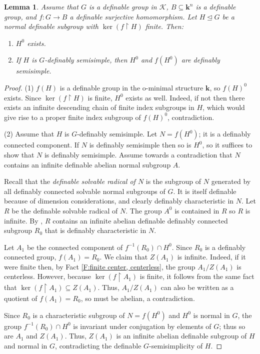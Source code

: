 \documentclass[11pt]{amsart}
\newtheorem{lemma}[theorem]{Lemma}
\theoremstyle{definition}
\newcommand{\bk}{\textbf{k}}
\newcommand{\CK}{{\mathcal K}}
\newcommand{\0}{\emptyset}
\def\sub{\subseteq}
\begin{document}
\begin{lemma}\label{L:connected subgroup of defsemisimple}
  Assume that  $G$ is a definable group in $\CK$,     $B\sub \bk^n$ is a definable group, and   $f:G\to B$ a definable surjective homomorphism.
    Let $H\trianglelefteq G$ be a normal definable subgroup with $\ker(f\restriction H)$ finite.
    Then:
    \begin{enumerate}
        \item $H^0$ exists.
        \item If $H$ is $G$-definably semisimple, then  $H^0$ and $f(H^0)$ are definably semisimple.
    \end{enumerate}
\end{lemma}
\begin{proof}
    
    
    (1) $f(H)$ is a definable group in the o-minimal structure $\bk$, so $f(H)^0$ exists. Since $\ker(f\restriction H)$ is finite, $H^0$ exists as well. Indeed, if not then there exists an infinite descending chain of finite index subgroups in $H$, which would give rise to  a proper finite index subgroup of  $f(H)^0$, contradiction.

    (2) Assume that $H$ is $G$-definably semisimple.  Let $N=f(H^0)$; it is a definably connected component. If $N$ is definably semisimple then so is $H^0$, so it suffices to show that $N$ is definably semisimple. Assume towards a contradiction that $N$ contains an infinite definable abelian normal subgroup $A$. 

    Recall that the {\em definable solvable radical of $N$} is
the subgroup of $N$ generated by all definably connected solvable normal subgroups of $G$. It is itself definable because of dimension considerations, and  clearly definably characteristic in $N$.  Let $R$ be the definable solvable radical of $N$. The group $A^0$ is contained in $R$ so $R$ is infinite. By \cite[Corollary 5.6]{baro-solvconn}, $R$ contains an infinite abelian definable definably connected subgroup $R_0$ that is definably characteristic in $N$.



    Let $A_1$ be the connected component of $f^{-1}(R_0)\cap H^0$. 
    Since $R_0$ is a definably connected group, $f(A_1)=R_0$. We claim that $Z(A_1)$ is infinite. Indeed, if it were finite then, by Fact \ref{F:finite center, centerless}, the group $A_1/Z(A_1)$
   is centerless. However, because  $\ker(f\restriction A_1)$ is finite, it follows from  the same fact that $\ker(f\restriction A_1)\sub Z(A_1)$. Thus, $A_1/Z(A_1)$ can also be written as a quotient of $f(A_1)=R_0$, so must be abelian, a contradiction.
    

     Since $R_0$ is a characteristic subgroup of $N=f(H^0)$ and $H^0$ is normal in $G$, the group $f^{-1}(R_0)\cap H^0$ is invariant under conjugation by elements of $G$; thus so are $A_1$ and $Z(A_1)$.  Thus, $Z(A_1)$ is an infinite abelian definable subgroup of $H$ and normal in $G$, contradicting the definable $G$-semisimplicity of $H$.
\end{proof}
\end{document}
